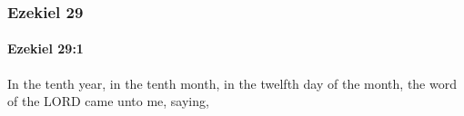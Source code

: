 	\subsubsection{Ezekiel 29} %
		\label{EZEKIEL-29}

		\paragraph{Ezekiel 29:1} %
			\label{EZEKIEL-29-1}

			In the tenth year, in the tenth month, in the twelfth day of the month, the word of the LORD came unto me, saying,


